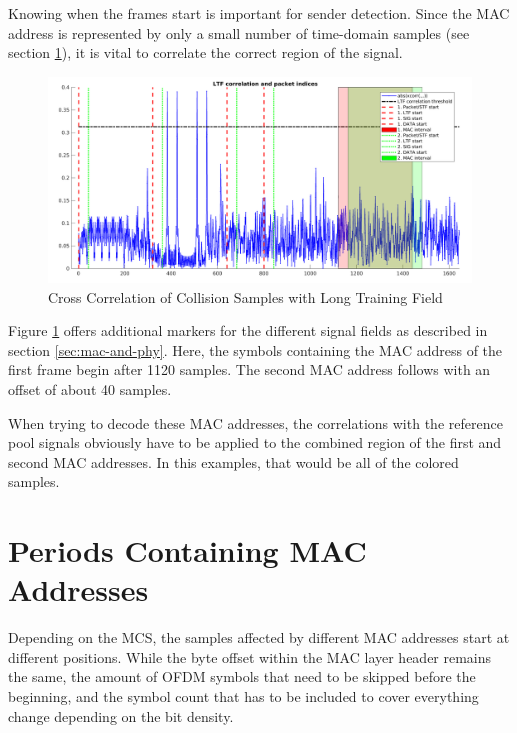 Knowing when the frames start is important for sender detection. Since the \gls{MAC} address is represented by only a small number of time-domain samples (see section \ref{sec:mac-periods}), it is vital to correlate the correct region of the signal.

\begin{figure}[H]
	\centering
	\includegraphics[width=\textwidth]{gfx/plots/seemoo_preamble-correlation-offset-with_boxes}
	\caption{Cross Correlation of Collision Samples with Long Training Field}
	\label{fig:preamble-corr}
\end{figure}

Figure \ref{fig:preamble-corr} offers additional markers for the different signal fields as described in section \ref{sec:mac-and-phy}. Here, the symbols containing the \gls{MAC} address of the first frame begin after 1120 samples. The second \gls{MAC} address follows with an offset of about 40 samples.

When trying to decode these \gls{MAC} addresses, the correlations with the reference pool signals obviously have to be applied to the combined region of the first and second \gls{MAC} addresses. In this examples, that would be all of the colored samples.



\section{Periods Containing MAC Addresses}\label{sec:mac-periods}

Depending on the \gls{MCS}, the samples affected by different \gls{MAC} addresses start at different positions. While the byte offset within the \gls{MAC} layer header remains the same, the amount of \gls{OFDM} symbols that need to be skipped before the beginning, and the symbol count that has to be included to cover everything change depending on the bit density.

